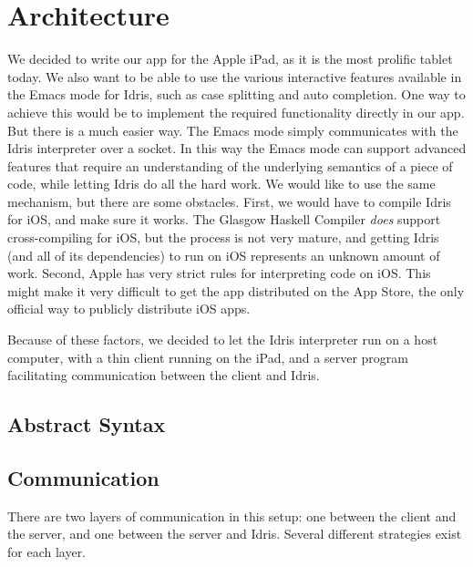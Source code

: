 \chapter{Architecture}
\label{sec:Architecture}

We decided to write our app for the Apple iPad, as it is the most prolific
tablet today. We also want to be able to use the various interactive features
available in the Emacs mode for Idris, such as case
splitting and auto completion. One way to achieve this would be to implement
the required functionality directly in our app. But there is a much easier way.
The Emacs mode simply communicates with the Idris interpreter over a socket. 
In this way the Emacs mode can support advanced features that require an
understanding of the underlying semantics of a piece of code, while letting
Idris do all the hard work. We would like to use the same mechanism, but there
are some obstacles. First, we would have to compile Idris for iOS, and make 
sure it works. The Glasgow Haskell Compiler \emph{does} support 
cross-compiling for iOS, but the process is not very mature, and
getting Idris (and all of its dependencies) to run on iOS represents an 
unknown amount of work. Second, Apple has very strict rules for interpreting
code on iOS\@. This might make it very difficult to get the app distributed on
the App Store, the only official way to publicly distribute iOS apps.

Because of these factors, we decided to let the Idris interpreter run on a 
host computer, with a thin client running on the iPad, and a server program 
facilitating communication between the client and Idris.

\section{Abstract Syntax}
\label{subsec:AbstractSyntax}



\section{Communication}
There are two layers of communication in this setup: one between the client and
the server, and one between the server and Idris. Several different strategies
exist for each layer. 

